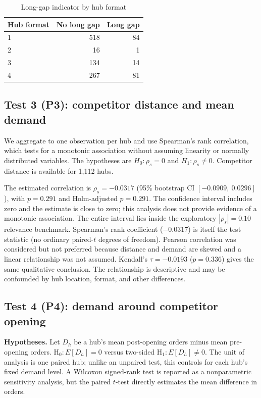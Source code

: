 \documentclass[10pt,a4paper,twocolumn]{article}
\newcommand{\Hnull}{\mathrm{H}_0}
\newcommand{\Halt}{\mathrm{H}_1}
\begin{document}
\begin{table}[t]
\centering
\caption{Long-gap indicator by hub format}
\label{tab:gaps}
\scriptsize
\begin{tabular}{lrr}
\toprule
Hub format & No long gap & Long gap\\
\midrule
1 & 518 & 84\\
2 & 16 & 1\\
3 & 134 & 14\\
4 & 267 & 81\\
\bottomrule
\end{tabular}
\end{table}

\subsection{Test 3 (P3): competitor distance and mean demand}
We aggregate to one observation per hub and use Spearman's rank correlation, which tests for a monotonic association without assuming linearity or normally distributed variables. The hypotheses are $H_0:\rho_s=0$ and $H_1:\rho_s\ne0$. Competitor distance is available for 1,112 hubs.

The estimated correlation is $\rho_s=-0.0317$ (95\% bootstrap CI $[-0.0909,\ 0.0296]$), with $p=0.291$ and Holm-adjusted $p=0.291$. The confidence interval includes zero and the estimate is close to zero; this analysis does not provide evidence of a monotonic association. The entire interval lies inside the exploratory $|\rho_s|=0.10$ relevance benchmark. Spearman's rank coefficient ($-0.0317$) is itself the test statistic (no ordinary paired-$t$ degrees of freedom). Pearson correlation was considered but not preferred because distance and demand are skewed and a linear relationship was not assumed. Kendall's $\tau=-0.0193$ ($p=0.336$) gives the same qualitative conclusion. The relationship is descriptive and may be confounded by hub location, format, and other differences.

\subsection{Test 4 (P4): demand around competitor opening}
\textbf{Hypotheses.} Let $D_h$ be a hub's mean post-opening orders minus mean pre-opening orders. $\Hnull:E[D_h]=0$ versus two-sided $\Halt:E[D_h]\ne0$. The unit of analysis is one paired hub; unlike an unpaired test, this controls for each hub's fixed demand level. A Wilcoxon signed-rank test is reported as a nonparametric sensitivity analysis, but the paired $t$-test directly estimates the mean difference in orders.
\end{document}
